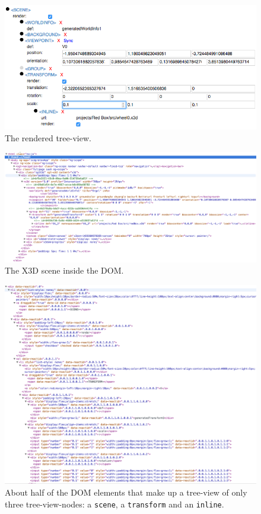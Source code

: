 \begin{figure}
  \centering
  \includegraphics[width=\textwidth]{../assets/treeview.png}
  \caption{The rendered tree-view.}
  \label{fig:tree-view}
\end{figure}

\begin{figure}
  \centering
  \includegraphics[width=\textwidth]{../assets/x3dom-dom.png}
  \caption{The X3D scene inside the DOM.}
  \label{fig:x3dom-dom}
\end{figure}

\begin{figure}
  \centering
  \includegraphics[width=\textwidth]{../assets/treeview-dom.png}
  \caption{About half of the DOM elements that make up a tree-view of only three tree-view-nodes: a \texttt{scene}, a \texttt{transform} and an \texttt{inline}.}
  \label{fig:treeview-dom}
\end{figure}

